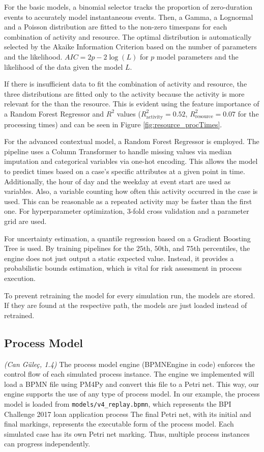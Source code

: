 \documentclass[
  english,
  font=times,
  twocolumn,
]{tumarticle}
\begin{document}
For the basic models, a binomial selector tracks the proportion of zero-duration events to accurately model instantaneous events. Then, a Gamma, a Lognormal and a Poisson distribution are fitted to the non-zero timespans for each combination of activity and resource. The optimal distribution is automatically selected by the Akaike Information Criterion based on the number of parameters and the likelihood. $AIC = 2p-2\log(L)$ for $p$ model parameters and the likelihood of the data given the model $L$.

If there is insufficient data to fit the combination of activity and resource, the three distributions are fitted only to the activity because the activity is more relevant for the than the resource. This is evident using the feature importance of a Random Forest Regressor and $R^2$ values ($R^2_{\text{activity}}=0.52$, $R^2_{\text{resource}}=0.07$ for the processing times) and can be seen in Figure \ref{fig:resource_procTimes}.

For the advanced contextual model, a Random Forest Regressor is employed. The pipeline uses a Column Transformer to handle missing values via median imputation and categorical variables via one-hot encoding. This allows the model to predict times based on a case's specific attributes at a given point in time. Additionally, the hour of day and the weekday at event start are used as variables. Also, a variable counting how often this activity occurred in the case is used. This can be reasonable as a repeated activity may be faster than the first one. For hyperparameter optimization, $3$-fold cross validation and a parameter grid are used.

For uncertainty estimation, a quantile regression based on a Gradient Boosting Tree is used. By training pipelines for the $25$th, $50$th, and $75$th percentiles, the engine does not just output a static expected value. Instead, it provides a probabilistic bounds estimation, which is vital for risk assessment in process execution.

To prevent retraining the model for every simulation run, the models are stored. If they are found at the respective path, the models are just loaded instead of retrained.

\subsection{Process Model}
\textit{(Can Güleç, 1.4)}\quad
The process model engine (BPMNEngine in code) enforces the control flow of each simulated process instance. The engine we implemented will load a BPMN file using PM4Py and convert this file to a Petri net. This way, our engine supports the use of any type of process model. In our example, the process model is loaded from \texttt{models/v4\_replay.bpmn}, which represents the BPI Challenge 2017 loan application process The final Petri net, with its initial and final markings, represents the executable form of the process model. Each simulated case has its own Petri net marking. Thus, multiple process instances can progress independently. 
\end{document}
